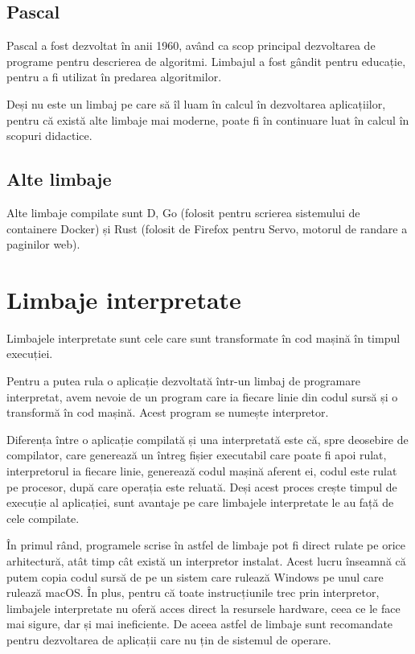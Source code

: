 \subsection{Pascal}
\label{sec:appdev:compiled-lang:pascal}

Pascal a fost dezvoltat în anii 1960, având ca scop principal dezvoltarea de programe pentru descrierea de algoritmi.
Limbajul a fost gândit pentru educație, pentru a fi utilizat în predarea algoritmilor.

Deși nu este un limbaj pe care să îl luam în calcul în dezvoltarea aplicațiilor, pentru că există alte limbaje mai moderne, poate fi în continuare luat în calcul în scopuri didactice.

\subsection{Alte limbaje}
\label{sec:appdev:compiled-lang:other}

Alte limbaje compilate sunt D, Go (folosit pentru scrierea sistemului de containere Docker) și Rust (folosit de Firefox pentru Servo, motorul de randare a paginilor web).

\section{Limbaje interpretate}
\label{sec:appdev-langs-int}

Limbajele interpretate sunt cele care sunt transformate în cod mașină în timpul execuției.

Pentru a putea rula o aplicație dezvoltată într-un limbaj de programare interpretat, avem nevoie de un program care ia fiecare linie din codul sursă și o transformă în cod mașină.
Acest program se numește interpretor.

Diferența între o aplicație compilată și una interpretată este că, spre deosebire de compilator, care generează un întreg fișier executabil care poate fi apoi rulat, interpretorul ia fiecare linie, generează codul mașină aferent ei, codul este rulat pe procesor, după care operația este reluată.
Deși acest proces crește timpul de execuție al aplicației, sunt avantaje pe care limbajele interpretate le au față de cele compilate.

În primul rând, programele scrise în astfel de limbaje pot fi direct rulate pe orice arhitectură, atât timp cât există un interpretor instalat.
Acest lucru înseamnă că putem copia codul sursă de pe un sistem care rulează Windows pe unul care rulează macOS.
În plus, pentru că toate instrucțiunile trec prin interpretor, limbajele interpretate nu oferă acces direct la resursele hardware, ceea ce le face mai sigure, dar și mai ineficiente.
De aceea astfel de limbaje sunt recomandate pentru dezvoltarea de aplicații care nu țin de sistemul de operare.

